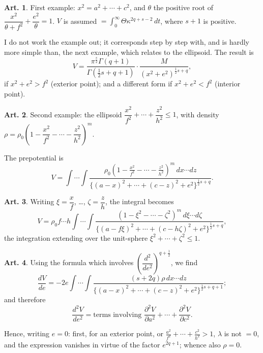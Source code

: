 \documentclass[12pt,a4paper]{article}
\theoremstyle{definition}
\newtheorem{art}{Art.}[section]
\begin{document}
\begin{art}\label{art:97}
First example: $x^2 = a^2 + \cdots + c^2$, and $\theta$ the positive root of $\dfrac{x^2}{\theta + f^2} + \dfrac{e^2}{\theta} = 1$. $V$ is assumed $= \int_0^\infty \Theta \kappa^{2q+s-2} \, dt$, where $s + 1$ is positive.

I do not work the example out; it corresponds step by step with, and is hardly more simple than, the next example, which relates to the ellipsoid. The result is
\[
V = \frac{\pi^{\frac{s}{2}}\Gamma(q+1)}{\Gamma(\frac{1}{2}s+q+1)} \cdot \frac{M}{(x^2 + e^2)^{\frac{1}{2}s+q}},
\]
if $x^2 + e^2 > f^2$ (exterior point); and a different form if $x^2 + e^2 < f^2$ (interior point).
\end{art}

\begin{art}\label{art:98}
Second example: the ellipsoid $\dfrac{x^2}{f^2} + \cdots + \dfrac{z^2}{h^2} \leq 1$, with density $\rho = \rho_0 \left(1 - \dfrac{x^2}{f^2} - \cdots - \dfrac{z^2}{h^2}\right)^m$.

The prepotential is
\[
V = \int \cdots \int \frac{\rho_0 \left(1 - \frac{x^2}{f^2} - \cdots - \frac{z^2}{h^2}\right)^m \, dx \cdots dz}{\{(a-x)^2 + \cdots + (c-z)^2 + e^2\}^{\frac{1}{2}s+q}}.
\]
\end{art}

\begin{art}\label{art:99}
Writing $\xi = \dfrac{x}{f}$, \ldots, $\zeta = \dfrac{z}{h}$, the integral becomes
\[
V = \rho_0 f \cdots h \int \cdots \int \frac{(1 - \xi^2 - \cdots - \zeta^2)^m \, d\xi \cdots d\zeta}{\{(a-f\xi)^2 + \cdots + (c-h\zeta)^2 + e^2\}^{\frac{1}{2}s+q}},
\]
the integration extending over the unit-sphere $\xi^2 + \cdots + \zeta^2 \leq 1$.
\end{art}

\begin{art}\label{art:100}
Using the formula which involves $\left(\dfrac{d^2}{de^2}\right)^{q+\frac{1}{2}}$, we find
\[
\frac{dV}{de} = -2e \int \cdots \int \frac{(s+2q)\rho \, dx \cdots dz}{\{(a-x)^2 + \cdots + (c-z)^2 + e^2\}^{\frac{1}{2}s+q+1}};
\]
and therefore
\[
\frac{d^2V}{de^2} = \text{terms involving } \frac{\partial^2 V}{\partial a^2} + \cdots + \frac{\partial^2 V}{\partial c^2}.
\]

Hence, writing $e = 0$: first, for an exterior point, or $\frac{a^2}{f^2} + \cdots + \frac{c^2}{h^2} > 1$, $\lambda$ is not $= 0$, and the expression vanishes in virtue of the factor $e^{2q+1}$; whence also $\rho = 0$.
\end{art}
\end{document}

